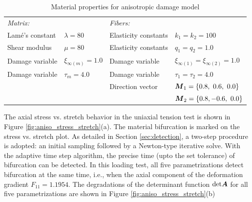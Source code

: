 \documentclass[12pt]{article}
\numberwithin{equation}{section}
\begin{document}
\begin{table}[H]
  \begin{center}
    \begin{tabular}{ l l l l }
      \toprule
      \it{Matrix}:
      &
      
      &
     
      \it{Fibers}:
      
      &
      \\
      Lam\'{e}'s constant
      &
      $\lambda=80$
      &
      Elasticity constants
      &
      $k_1 = k_2 = 100$
      \\
      Shear modulus
      &
      $\mu = 80$
      &
      Elasticity constants
      &
      $q_1 = q_2 = 1.0$      
      \\
      Damage variable  
      &
      $\xi_{\infty(m)} = 1.0$
      &
      Damage variable
      &
      $\xi_{\infty(1)} = \xi_{\infty(2)} = 1.0$      
      \\
      Damage variable   
      &
      $\tau_m = 4.0$
      &
      Damage variable
      &
      $\tau_1 = \tau_2 = 4.0$
      \\
      &
      
      &
      Direction vector
      &
      ${\boldsymbol{M}}_1 = \{ 0.8,~0.6,~0.0\}$
      \\
      &

      &
	       
      &
      ${\boldsymbol{M}}_2 = \{ 0.8,-0.6,~0.0\}$
      \\
      \bottomrule
    \end{tabular}
    \caption{Material properties for anisotropic damage model}
    \label{tab:aniso_material}
  \end{center}
\end{table}

The axial stress vs. stretch behavior in the uniaxial tension test is 
shown in Figure \ref{fig:aniso_stress_stretch}(a). The material 
bifurcation is marked on the stress vs. stretch plot. As detailed in 
Section \ref{sec:detection}, a two-step procedure is adopted: an 
initial sampling followed by a Newton-type iterative solve. With the 
adaptive time step algorithm, the precise time (upto the set 
tolerance) of bifurcation can be detected. In this loading test, all 
five parametrizations detect bifurcation at the same time, i.e., when 
the axial component of the deformation gradient $F_11 = 1.1954$. The 
degradations of the determinant function ${\rm det}{\boldsymbol{A}}$ for all five 
parametrizations are shown in Figure \ref{fig:aniso_stress_stretch}(b)
\end{document}
